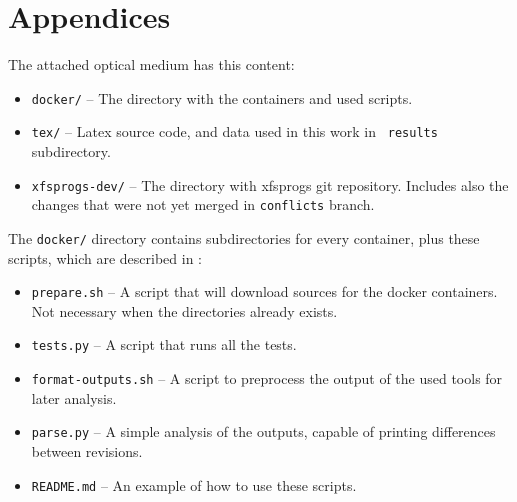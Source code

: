\chapter*{Appendices}
The attached optical medium has this content:
\begin{itemize}
\item {\tt docker/} -- The directory with the containers and used scripts.
\item {\tt tex/} -- Latex source code, and data used in this work in {\tt
	results} subdirectory.
\item {\tt xfsprogs-dev/} -- The directory with xfsprogs git repository.
Includes also the changes that were not yet merged in {\tt conflicts}
branch.
\end{itemize}

The {\tt docker/} directory contains subdirectories for every
container, plus these scripts, which are described in :
\begin{itemize}
\item {\tt prepare.sh} -- A script that will download sources for the docker
containers. Not necessary when the directories already exists.
\item {\tt tests.py} -- A script that runs all the tests.
\item {\tt format-outputs.sh} -- A script to preprocess the output of the used
tools for later analysis.
\item {\tt parse.py} -- A simple analysis of the outputs, capable of
printing differences between revisions.
\item {\tt README.md} -- An example of how to use these scripts.
\end{itemize}

